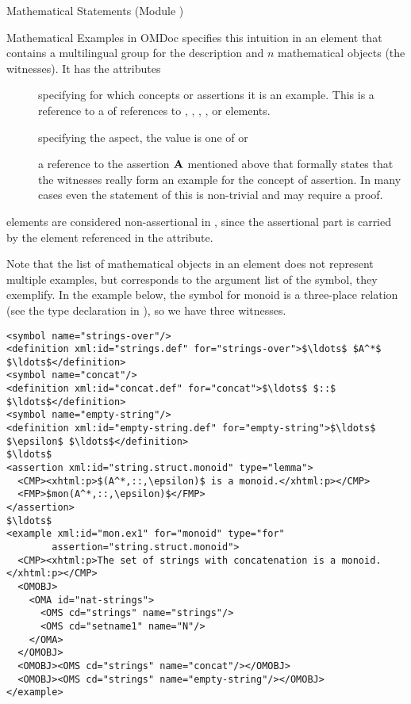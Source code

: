 \begin{tchapter}[id=statements,short=Mathematical Statements]{Mathematical Statements (Module {})}
\begin{tsection}[id=examples]{Mathematical Examples in OMDoc}
  {\omdoc} specifies this intuition in an {} element that contains a
  multilingual {} group for the description and $n$
  mathematical objects (the witnesses). It has the attributes
\begin{description}
\item[{}] specifying for which concepts or assertions it is an
  example.  This is a reference to a {} of
  {} references to {}, {},
  {}, {}, or {} elements.
\item[{}] specifying the aspect, the value is one of
  {} or {}
\item[{}] a reference to the assertion ${\bf A}$
  mentioned above that formally states that the witnesses really form an example for the
  concept of assertion. In many cases even the statement of this is non-trivial
  and may require a proof.
\end{description}

{} elements are considered non-assertional in
{\omdoc}, since the assertional part is carried by the {} element
referenced in the {} attribute.

Note that the list of mathematical objects in an {} element does not
represent multiple examples, but corresponds to the argument list of the symbol, they
exemplify. In the example below, the symbol for monoid is a three-place relation (see the
type declaration in {}), so we have three witnesses.

\begin{lstlisting}[label=lst:example,mathescape,
  caption={An {\omdoc} representation of a mathematical example},
  index={example,for,type,assertion}]
<symbol name="strings-over"/>
<definition xml:id="strings.def" for="strings-over">$\ldots$ $A^*$ $\ldots$</definition>
<symbol name="concat"/>
<definition xml:id="concat.def" for="concat">$\ldots$ $::$ $\ldots$</definition>
<symbol name="empty-string"/>
<definition xml:id="empty-string.def" for="empty-string">$\ldots$ $\epsilon$ $\ldots$</definition>
$\ldots$
<assertion xml:id="string.struct.monoid" type="lemma">
  <CMP><xhtml:p>$(A^*,::,\epsilon)$ is a monoid.</xhtml:p></CMP>
  <FMP>$mon(A^*,::,\epsilon)$</FMP>
</assertion>
$\ldots$
<example xml:id="mon.ex1" for="monoid" type="for"
        assertion="string.struct.monoid">
  <CMP><xhtml:p>The set of strings with concatenation is a monoid.</xhtml:p></CMP>
  <OMOBJ>
    <OMA id="nat-strings">
      <OMS cd="strings" name="strings"/>
      <OMS cd="setname1" name="N"/>
    </OMA>
  </OMOBJ>
  <OMOBJ><OMS cd="strings" name="concat"/></OMOBJ>
  <OMOBJ><OMS cd="strings" name="empty-string"/></OMOBJ>
</example>


\end{lstlisting}
\end{tsection}
\end{tchapter}
